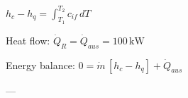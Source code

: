 \( h_c - h_q = \int_{T_1}^{T_2} c_{if} \, dT \)  

Heat flow:  
\( \dot{Q}_R = \dot{Q}_{aus} = 100 \, \text{kW} \)  

Energy balance:  
\( 0 = \dot{m} \, [h_c - h_q] + \dot{Q}_{aus} \)  

---